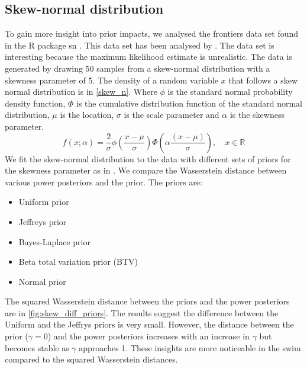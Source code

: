 \documentclass[12pt]{article}
\begin{document}
\subsection{Skew-normal distribution}
To gain more insight into prior impacts, we analysed the frontiers data set found in the R package sn \citep{azzalini2023}. This data set has been analysed by \cite{ghaderinezhadWassersteinImpactMeasure2022}. The data set is interesting because the maximum likelihood estimate is unrealistic. The data is generated by drawing 50 samples from a skew-normal distribution with a skewness parameter of 5. The density of a random variable $x$ that follows a skew normal distribution \citep{azzaliniClassD1985} is in \cref{skew_n}. Where $\phi$ is the standard normal probability density function, $\Phi$ is the cumulative distribution function of the standard normal distribution, $\mu$ is the location, $\sigma$ is the scale parameter and $\alpha$ is the skewness parameter.
\begin{equation}
    f(x; \alpha) = \frac{2}{\sigma} \phi \left( \frac{x - \mu}{\sigma} \right) \Phi \left( \alpha \frac{(x - \mu)}{\sigma}  \right), \quad x \in \mathbb{R}
    \label{skew_n}
\end{equation}
We fit the skew-normal distribution to the data with different sets of priors for the skewness parameter as in \cite{ghaderinezhadWassersteinImpactMeasure2022}. We compare the Wasserstein distance between various power posteriors and the prior. The priors are: 
\begin{itemize}
\item Uniform prior
\item Jeffreys prior
\item Bayes-Laplace prior
\item Beta total variation prior (BTV)
\item Normal prior
\end{itemize}
The squared Wasserstein distance between the priors and the power posteriors are in \cref{fig:skew_diff_priors}. The results suggest the difference between the Uniform and the Jeffrys priors is very small. However, the distance between the prior ($\gamma=0$) and the power posteriors increases with an increase in $\gamma$ but becomes stable as $\gamma$ approaches 1. These insights are more noticeable in the \gls{swim} compared to the squared Wasserstein distances.
\end{document}
